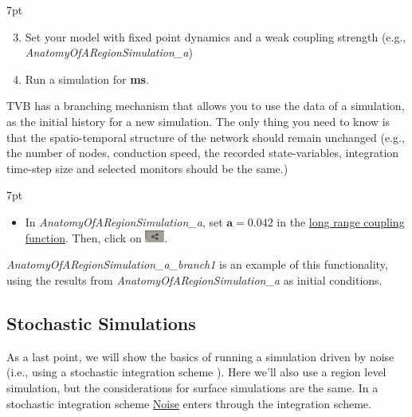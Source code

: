 \documentclass{tufte-handout}
\newenvironment{simulation}{%
  \def\FrameCommand{%
    \hspace{1pt}%
    {\color{ForestGreen}\vrule width 2pt}%
    {\color{simulationshade}\vrule width 4pt}%
    \colorbox{simulationshade}%
  }%
  \MakeFramed{\advance\hsize-\width\FrameRestore}%
  \noindent\hspace{-4.55pt}%
  \begin{adjustwidth}{}{7pt}%
  \vspace{2pt}\vspace{2pt}%
}
{%
  \vspace{2pt}\end{adjustwidth}\endMakeFramed%
}
\begin{document}
\begin{simulation}
\begin{enumerate}[resume]
 \setcounter{enumi}{2}
\item Set your model with fixed point dynamics and a weak coupling strength (e.g., \textit{AnatomyOfARegionSimulation\_a})
\item Run a simulation for \textbf{\unit[1000]{ms}}.
\end{enumerate}
\end{simulation}

TVB has a branching mechanism that allows you to use the data of a simulation, as the initial history for a new simulation. The only thing you
need to know is that the spatio-temporal structure of the network should
remain unchanged (e.g., the number of nodes, conduction speed, the recorded state-variables, integration time-step size and selected monitors should be the same.)

\begin{simulation}
\begin{itemize}[resume]
 \setcounter{enumi}{4}
 \item In \textit{AnatomyOfARegionSimulation\_a}, set $\mathbf{a=0.042}$ in the \underline{long range coupling function}. Then, click on \includegraphics[width=0.05\textwidth]{butt_branching.png}. 
\end{itemize}
\end{simulation}

\textit{AnatomyOfARegionSimulation\_a\_branch1} is an example of this functionality, using the results from \textit{AnatomyOfARegionSimulation\_a} as initial conditions. 

\subsection{Stochastic Simulations}\label{sec:noisy_simulations}


As a last point, we will show the basics of running a simulation driven by
noise (i.e., using a stochastic integration scheme ). Here we'll also use a region level simulation, but the
considerations for surface simulations are the same. In a stochastic
integration scheme \underline{Noise} enters through the integration scheme.
\end{document}
